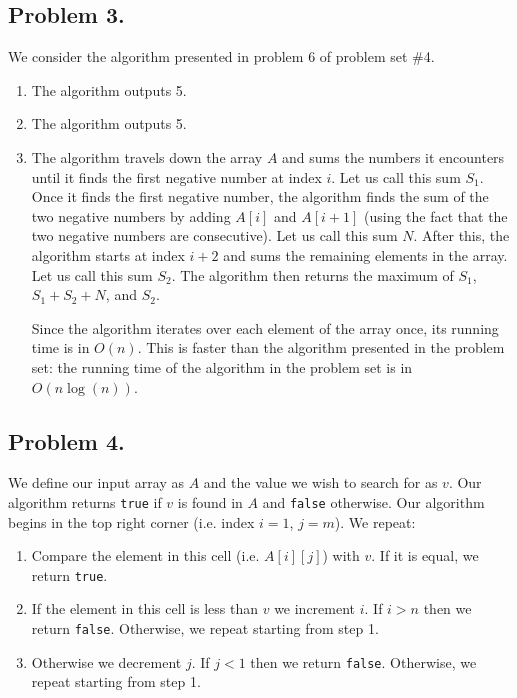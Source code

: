 \documentclass[11pt, letterpaper, titlepage]{article}
\begin{document}
\newpage

\subsection*{Problem 3.}
We consider the algorithm presented in problem 6 of problem set \#4.
\begin{enumerate}[label=\alph*.]
    \item The algorithm outputs 5. 
    \item The algorithm outputs 5.
    \item The algorithm travels down the array $A$ and sums the numbers it encounters until it finds the first negative number at index $i$. Let us call this sum $S_1$. Once it finds the first negative number, the algorithm finds the sum of the two negative numbers by adding $A[i]$ and $A[i + 1]$ (using the fact that the two negative numbers are consecutive). Let us call this sum $N$. After this, the algorithm starts at index $i + 2$ and sums the remaining elements in the array. Let us call this sum $S_2$. The algorithm then returns the maximum of $S_1$, $S_1 + S_2 + N$, and $S_2$. 
    
    Since the algorithm iterates over each element of the array once, its running time is in $O(n)$. This is faster than the algorithm presented in the problem set: the running time of the algorithm in the problem set is in $O(n\log(n))$.
\end{enumerate}

\newpage

\subsection*{Problem 4.}
We define our input array as $A$ and the value we wish to search for as $v$. Our algorithm returns \texttt{true} if $v$ is found in $A$ and \texttt{false} otherwise. Our algorithm begins in the top right corner (i.e. index $i = 1$, $j = m$). We repeat:
\begin{enumerate}
    \item Compare the element in this cell (i.e. $A[i][j]$) with $v$. If it is equal, we return \texttt{true}.
    \item If the element in this cell is less than $v$ we increment $i$. If $i > n$ then we return \texttt{false}. Otherwise, we repeat starting from step 1.
    \item Otherwise we decrement $j$. If $j < 1$ then we return \texttt{false}. Otherwise, we repeat starting from step 1.
\end{enumerate}
\end{document}
